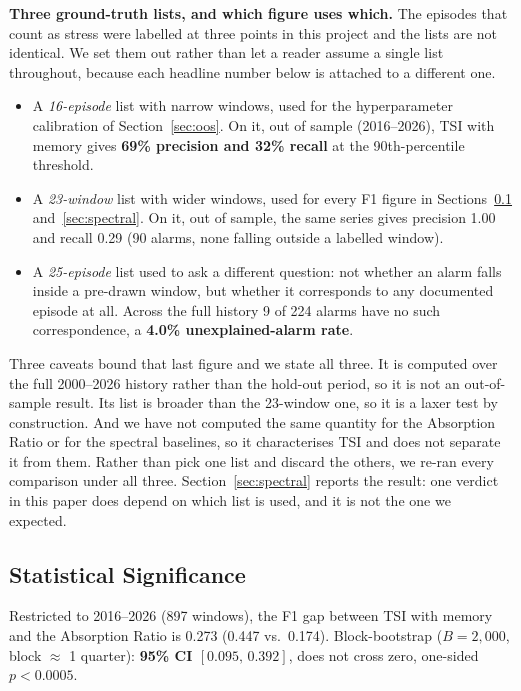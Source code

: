 \documentclass[11pt,a4paper]{article}
\begin{document}
\textbf{Three ground-truth lists, and which figure uses which.} The episodes
that count as stress were labelled at three points in this project and the
lists are not identical. We set them out rather than let a reader assume a
single list throughout, because each headline number below is attached to a
different one.

\begin{itemize}
\item A \emph{16-episode} list with narrow windows, used for the
  hyperparameter calibration of Section~\ref{sec:oos}. On it, out of sample
  (2016--2026), TSI with memory gives \textbf{69\% precision and 32\%
  recall} at the 90th-percentile threshold.
\item A \emph{23-window} list with wider windows, used for every F1 figure in
  Sections~\ref{sec:signif} and~\ref{sec:spectral}. On it, out of sample, the
  same series gives precision 1.00 and recall 0.29 (90 alarms, none falling
  outside a labelled window).
\item A \emph{25-episode} list used to ask a different question: not whether
  an alarm falls inside a pre-drawn window, but whether it corresponds to any
  documented episode at all. Across the full history 9 of 224 alarms have no
  such correspondence, a \textbf{4.0\% unexplained-alarm rate}.
\end{itemize}

Three caveats bound that last figure and we state all three. It is computed
over the full 2000--2026 history rather than the hold-out period, so it is not
an out-of-sample result. Its list is broader than the 23-window one, so it is a
laxer test by construction. And we have not computed the same quantity for the
Absorption Ratio or for the spectral baselines, so it characterises TSI
and does not separate it from them. Rather than pick one list and discard the others, we re-ran every comparison
under all three. Section~\ref{sec:spectral} reports the result: one verdict in
this paper does depend on which list is used, and it is not the one we
expected.


\subsection{Statistical Significance}
\label{sec:signif}

Restricted to 2016--2026 (897 windows), the F1 gap between
TSI with memory and the Absorption Ratio is 0.273 (0.447 vs.\ 0.174).
Block-bootstrap ($B=2{,}000$, block $\approx$ 1 quarter):
\textbf{95\% CI $[0.095,\, 0.392]$}, does not cross zero, one-sided
$p < 0.0005$.
\end{document}

